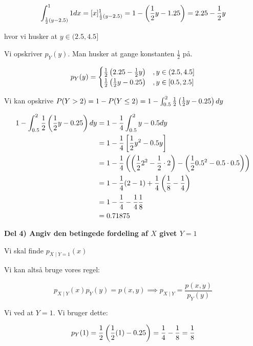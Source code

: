 \begin{equation}
    \int^{1}_{\frac{1}{2}(y - 2.5)} 1 dx = [x]_{\frac{1}{2}(y - 2.5)}^{1} = 1 - \left( \frac{1}{2} y - 1.25\right) = 2.25 - \frac{1}{2}y 
\end{equation}

hvor vi husker at $y \in (2.5 , 4.5]$

Vi opskriver $p_Y (y)$. Man husker at gange konstanten $\frac{1}{2}$ på.

\begin{equation}
    p_Y(y) = 
    \begin{cases}
        \frac{1}{2}\left( 2.25 - \frac{1}{2}y \right) &,y \in (2.5 , 4.5] \\
        \frac{1}{2}\left( \frac{1}{2}y - 0.25 \right) & ,y\in [0.5, 2.5]
    \end{cases}
\end{equation}

Vi kan opskrive $P(Y>2) = 1- P(Y\leq2) = 1- \int_{0.5}^{2} \frac{1}{2}\left(\frac{1}{2}y - 0.25\right) dy$

\begin{align}
   1- \int_{0.5}^{2} \frac{1}{2}\left(\frac{1}{2}y - 0.25\right) dy &= 1 - \frac{1}{4}\int_{0.5}^{2} y - 0.5 dy \\  
   &= 1 - \frac{1}{4} \left[ \frac{1}{2}y^2 - 0.5y \right] \\
   &= 1 - \frac{1}{4}\left( \left(\frac{1}{2}2^2 - \frac{1}{2} \cdot 2 \right) - \left( \frac{1}{2}0.5^2 - 0.5 \cdot 0.5\right) \right) \\
   &= 1 - \frac{1}{4}( 2 - 1) + \frac{1}{4}\left( \frac{1}{8} - \frac{1}{4} \right) \\
   &= 1 - \frac{1}{4} - \frac{1}{4}\frac{1}{8} \\
   &= 0.71875
\end{align}

\textbf{Del 4) Angiv den betingede fordeling af $X$ givet $Y=1$}

Vi skal finde $p_{X \mid Y=1}(x)$

Vi kan altså bruge vores regel:

\begin{equation}
    p_{X \mid Y} (x) p_{Y}(y) = p(x , y) \implies p_{X \mid Y} = \frac{p(x,y)}{p_Y(y)}
\end{equation}

Vi ved at $Y=1$. Vi bruger dette:

\begin{equation}
    p_{Y}(1) = \frac{1}{2}\left( \frac{1}{2}(1) - 0.25\right) = \frac{1}{4} - \frac{1}{8} = \frac{1}{8}
\end{equation}

